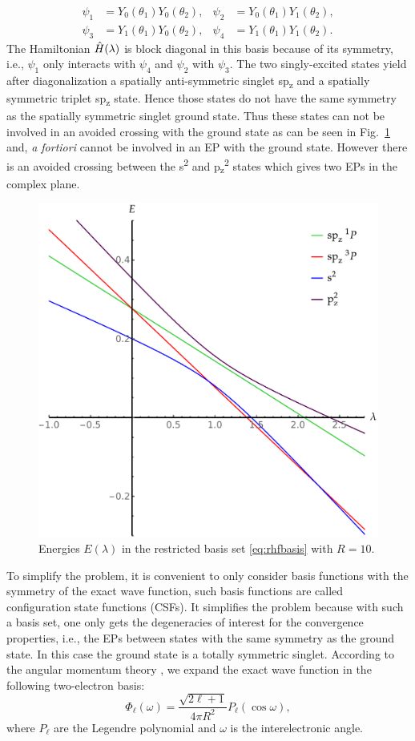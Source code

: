 \documentclass[11pt,a4paper]{article}
\newcommand{\hH}{\Hat{H}}
\begin{document}
\begin{align}\label{eq:rhfbasis}
 \psi_1 & =Y_{0}(\theta_1)Y_{0}(\theta_2),
 & 
 \psi_2 & =Y_{0}(\theta_1)Y_{1}(\theta_2),\\
 \psi_3 & =Y_{1}(\theta_1)Y_{0}(\theta_2),
 & 
 \psi_4 & =Y_{1}(\theta_1)Y_{1}(\theta_2).
\end{align}
The Hamiltonian $\hH(\lambda)$ is block diagonal in this basis because of its symmetry, i.e., $\psi_1$ only interacts with $\psi_4$ and $\psi_2$ with $\psi_3$. The two singly-excited states yield after diagonalization a spatially anti-symmetric singlet sp\textsubscript{z} and a spatially symmetric triplet sp\textsubscript{z} state. Hence those states do not have the same symmetry as the spatially symmetric singlet ground state. Thus these states can not be involved in an avoided crossing with the ground state as can be seen in Fig.~\ref{fig:RHFMiniBas} and, \textit{a fortiori} cannot be involved in an EP with the ground state. However there is an avoided crossing between the s\textsuperscript{2} and p\textsubscript{z}\textsuperscript{2} states which gives two EPs in the complex plane. 

\begin{figure}
    \centering
    \includegraphics[width=0.5\linewidth]{EMP_RHF_R10.pdf}
    \caption{Energies $E(\lambda)$ in the restricted basis set \eqref{eq:rhfbasis} with $R=10$.}
    \label{fig:RHFMiniBas}
\end{figure}

To simplify the problem, it is convenient to only consider basis functions with the symmetry of the exact wave function, such basis functions are called configuration state functions (CSFs). It simplifies the problem because with such a basis set, one only gets the degeneracies of interest for the convergence properties, i.e., the EPs between states with the same symmetry as the ground state. In this case the ground state is a totally symmetric singlet. According to the angular momentum theory \cite{AngularBook, SlaterBook, Loos_2009}, we expand the exact wave function in the following two-electron basis:
\begin{equation}
\Phi_\ell(\omega)=\frac{\sqrt{2\ell+1}}{4\pi R^2}P_\ell(\cos\omega),
\end{equation}
where $P_\ell$ are the Legendre polynomial and $\omega$ is the interelectronic angle.
\end{document}
